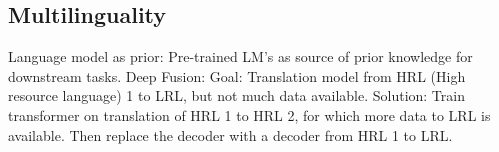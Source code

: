 \documentclass{scrartcl}
\begin{document}
\subsection*{Multilinguality}
Language model as prior: Pre-trained LM's as source of prior knowledge for downstream tasks.
Deep Fusion: Goal: Translation model from HRL (High resource language) 1 to LRL, but not much data available. Solution: Train transformer on translation of HRL 1 to HRL 2, for which more data to LRL is available. Then replace the decoder with a decoder from HRL 1 to LRL.
\end{document}

